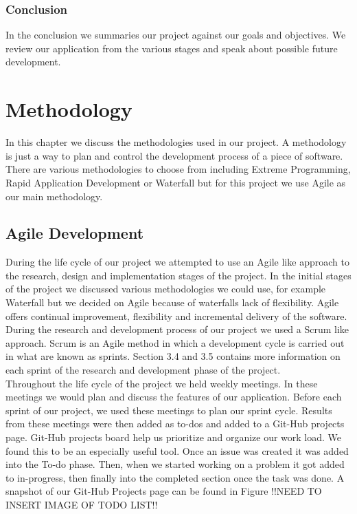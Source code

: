 \documentclass[12pt,a4paper,oneside,openany]{book}
\begin{document}
\subsection{Conclusion}
In the conclusion we summaries our project against our goals and objectives. We review our application from the various stages and speak about possible future development.

\chapter{Methodology}

In this chapter we discuss the methodologies used in our project. A methodology is just a way to plan and control the development process of a piece of software. There are various methodologies to choose from including Extreme Programming, Rapid Application Development or Waterfall but for this project we use Agile as our main methodology.


\section{Agile Development}
During the life cycle of our project we attempted to use an Agile like approach to the research, design and implementation stages of the project. In the initial stages of the project we discussed various methodologies we could use, for example Waterfall but we decided on Agile because of waterfalls lack of flexibility. Agile offers continual improvement, flexibility and incremental delivery of the software.  \\

\noindent During the research and development process of our project we used a Scrum like approach. Scrum is an Agile method in which a development cycle is carried out in what are known as sprints. Section 3.4 and 3.5 contains more information on each sprint of the research and development phase of the project. \\

\noindent Throughout the life cycle of the project we held weekly meetings. In these meetings we would plan and discuss the features of our application. Before each sprint of our project, we used these meetings to plan our sprint cycle. Results from these meetings were then added as to-dos and added to a Git-Hub projects page. Git-Hub projects board help us prioritize and organize our work load. We found this to be an especially useful tool. Once an issue was created it was added into the To-do phase. Then, when we started working on a problem it got added to in-progress, then finally into the completed section once the task was done. A snapshot of our Git-Hub Projects page can be found in Figure !!NEED TO INSERT IMAGE OF TODO LIST!!\\
\end{document}
